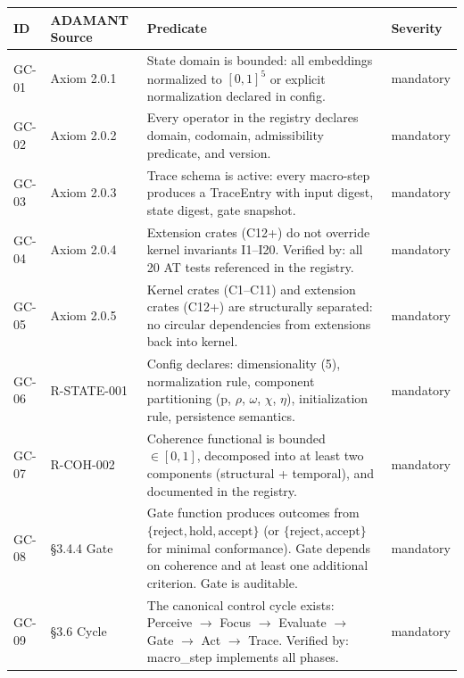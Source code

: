 \documentclass[11pt,a4paper,twoside]{article}
\theoremstyle{definition}
\theoremstyle{plain}
\theoremstyle{remark}
\newcommand{\ADAMANT}{\textsf{ADAMANT}}
\begin{document}
\begin{longtable}{l l p{5.5cm} l}
\toprule
\textbf{ID} & \textbf{\ADAMANT{} Source} & \textbf{Predicate} &
  \textbf{Severity} \\
\midrule
\endfirsthead \midrule \endhead \bottomrule \endfoot

GC-01 & Axiom 2.0.1 & State domain is bounded:
  all embeddings normalized to $[0,1]^5$ or explicit normalization
  declared in config. & mandatory \\

GC-02 & Axiom 2.0.2 & Every operator in the registry declares
  domain, codomain, admissibility predicate, and version. & mandatory \\

GC-03 & Axiom 2.0.3 & Trace schema is active: every macro-step
  produces a TraceEntry with input digest, state digest, gate
  snapshot. & mandatory \\

GC-04 & Axiom 2.0.4 & Extension crates (C12+) do not override
  kernel invariants I1--I20. Verified by: all 20 AT tests
  referenced in the registry. & mandatory \\

GC-05 & Axiom 2.0.5 & Kernel crates (C1--C11) and extension crates
  (C12+) are structurally separated: no circular dependencies
  from extensions back into kernel. & mandatory \\

GC-06 & R-STATE-001 & Config declares: dimensionality (5),
  normalization rule, component partitioning (p, $\rho$, $\omega$,
  $\chi$, $\eta$), initialization rule, persistence semantics. &
  mandatory \\

GC-07 & R-COH-002 & Coherence functional is bounded $\in [0,1]$,
  decomposed into at least two components (structural +
  temporal), and documented in the registry. & mandatory \\

GC-08 & \S3.4.4 Gate & Gate function produces outcomes from
  $\{\text{reject}, \text{hold}, \text{accept}\}$ (or
  $\{\text{reject}, \text{accept}\}$ for minimal conformance).
  Gate depends on coherence and at least one additional criterion.
  Gate is auditable. & mandatory \\

GC-09 & \S3.6 Cycle & The canonical control cycle exists: Perceive
  $\to$ Focus $\to$ Evaluate $\to$ Gate $\to$ Act $\to$ Trace.
  Verified by: macro\_step implements all phases. & mandatory \\


\end{longtable}
\end{document}
